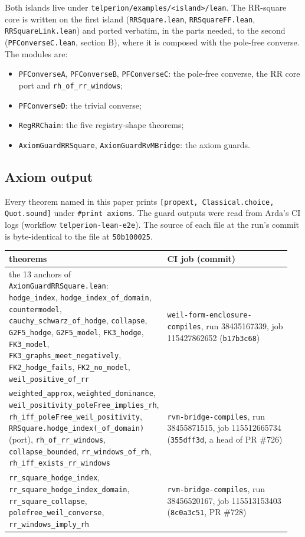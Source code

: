 \documentclass[11pt]{article}
\theoremstyle{definition}
\newcommand{\lean}[1]{\texttt{#1}}
\begin{document}
\noindent Both islands live under \lean{telperion/examples/}\allowbreak\lean{<island>/lean}. The RR-square core is written on the first island (\lean{RRSquare.lean}, \lean{RRSquareFF.lean}, \lean{RRSquareLink.lean}) and ported verbatim, in the parts needed, to the second (\lean{PFConverseC.lean}, section B), where it is composed with the pole-free converse. The modules are:
\begin{itemize}[leftmargin=*]
\item \lean{PFConverseA}, \lean{PFConverseB}, \lean{PFConverseC}: the pole-free converse, the RR core port and \lean{rh\_of\_rr\_windows};
\item \lean{PFConverseD}: the trivial converse;
\item \lean{RegRRChain}: the five registry-shape theorems;
\item \lean{AxiomGuardRRSquare}, \lean{AxiomGuardRvMBridge}: the axiom guards.
\end{itemize}

\subsection{Axiom output}

Every theorem named in this paper prints \lean{[propext, Classical.choice, Quot.sound]} under \lean{\#print axioms}. The guard outputs were read from Arda's CI logs (workflow \lean{telperion-lean-e2e}). The source of each file at the run's commit is byte-identical to the file at \lean{50b100025}.

\begin{center}\small
\begin{tabular}{@{}p{0.48\linewidth}p{0.47\linewidth}@{}}
\toprule
theorems & CI job (commit) \\
\midrule
the 13 anchors of \lean{AxiomGuardRRSquare.lean}: \lean{hodge\_index}, \lean{hodge\_index\_of\_domain}, \lean{countermodel}, \lean{cauchy\_schwarz\_of\_hodge}, \lean{collapse}, \lean{G2F5\_hodge}, \lean{G2F5\_model}, \lean{FK3\_hodge}, \lean{FK3\_model}, \lean{FK3\_graphs\_meet\_negatively}, \lean{FK2\_hodge\_fails}, \lean{FK2\_no\_model}, \lean{weil\_positive\_of\_rr} & \lean{weil-form-enclosure-compiles}, run 38435167339, job 115427862652 (\lean{b17b3c68}) \\
\addlinespace
\lean{weighted\_approx}, \lean{weighted\_dominance}, \lean{weil\_positivity\_poleFree\_implies\_rh}, \lean{rh\_iff\_poleFree\_weil\_positivity}, \lean{RRSquare.hodge\_index(\_of\_domain)} (port), \lean{rh\_of\_rr\_windows}, \lean{collapse\_bounded}, \lean{rr\_windows\_of\_rh}, \lean{rh\_iff\_exists\_rr\_windows} & \lean{rvm-bridge-compiles}, run 38455871515, job 115512665734 (\lean{355dff3d}, a head of PR \#726) \\
\addlinespace
\lean{rr\_square\_hodge\_index}, \lean{rr\_square\_hodge\_index\_domain}, \lean{rr\_square\_collapse}, \lean{polefree\_weil\_converse}, \lean{rr\_windows\_imply\_rh} & \lean{rvm-bridge-compiles}, run 38456520167, job 115513153403 (\lean{8c0a3c51}, PR \#728) \\
\bottomrule
\end{tabular}
\end{center}
\end{document}
